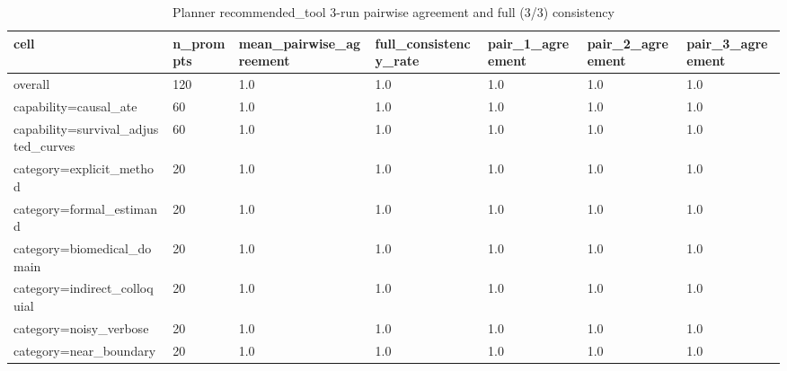 \begin{table}[ht]
\centering
\caption{Planner recommended\_tool 3-run pairwise agreement and full (3/3) consistency}
\label{tab:planner_consistency}
\begin{tabular}{lllllll}
\toprule
cell & n\_prompts & mean\_pairwise\_agreement & full\_consistency\_rate & pair\_1\_agreement & pair\_2\_agreement & pair\_3\_agreement \\
\midrule
overall & 120 & 1.0 & 1.0 & 1.0 & 1.0 & 1.0 \\
capability=causal\_ate & 60 & 1.0 & 1.0 & 1.0 & 1.0 & 1.0 \\
capability=survival\_adjusted\_curves & 60 & 1.0 & 1.0 & 1.0 & 1.0 & 1.0 \\
category=explicit\_method & 20 & 1.0 & 1.0 & 1.0 & 1.0 & 1.0 \\
category=formal\_estimand & 20 & 1.0 & 1.0 & 1.0 & 1.0 & 1.0 \\
category=biomedical\_domain & 20 & 1.0 & 1.0 & 1.0 & 1.0 & 1.0 \\
category=indirect\_colloquial & 20 & 1.0 & 1.0 & 1.0 & 1.0 & 1.0 \\
category=noisy\_verbose & 20 & 1.0 & 1.0 & 1.0 & 1.0 & 1.0 \\
category=near\_boundary & 20 & 1.0 & 1.0 & 1.0 & 1.0 & 1.0 \\
\bottomrule
\end{tabular}
\end{table}
